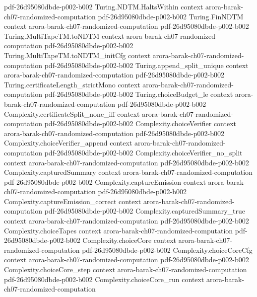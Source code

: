 \begin{theorem}
  {pdf-26d95080dbde-p002-b002}
\proofstep
  {Turing.NDTM.HaltsWithin}
  {context}
  {arora-barak-ch07-randomized-computation}
  {pdf-26d95080dbde-p002-b002}
\proofstep
  {Turing.FinNDTM}
  {context}
  {arora-barak-ch07-randomized-computation}
  {pdf-26d95080dbde-p002-b002}
\proofstep
  {Turing.MultiTapeTM.toNDTM}
  {context}
  {arora-barak-ch07-randomized-computation}
  {pdf-26d95080dbde-p002-b002}
\proofstep
  {Turing.MultiTapeTM.toNDTM_initCfg}
  {context}
  {arora-barak-ch07-randomized-computation}
  {pdf-26d95080dbde-p002-b002}
\proofstep
  {Turing.append_split_unique}
  {context}
  {arora-barak-ch07-randomized-computation}
  {pdf-26d95080dbde-p002-b002}
\proofstep
  {Turing.certificateLength_strictMono}
  {context}
  {arora-barak-ch07-randomized-computation}
  {pdf-26d95080dbde-p002-b002}
\proofstep
  {Turing.choiceBudget_le}
  {context}
  {arora-barak-ch07-randomized-computation}
  {pdf-26d95080dbde-p002-b002}
\proofstep
  {Complexity.certificateSplit_none_iff}
  {context}
  {arora-barak-ch07-randomized-computation}
  {pdf-26d95080dbde-p002-b002}
\proofstep
  {Complexity.choiceVerifier}
  {context}
  {arora-barak-ch07-randomized-computation}
  {pdf-26d95080dbde-p002-b002}
\proofstep
  {Complexity.choiceVerifier_append}
  {context}
  {arora-barak-ch07-randomized-computation}
  {pdf-26d95080dbde-p002-b002}
\proofstep
  {Complexity.choiceVerifier_no_split}
  {context}
  {arora-barak-ch07-randomized-computation}
  {pdf-26d95080dbde-p002-b002}
\proofstep
  {Complexity.capturedSummary}
  {context}
  {arora-barak-ch07-randomized-computation}
  {pdf-26d95080dbde-p002-b002}
\proofstep
  {Complexity.captureEmission}
  {context}
  {arora-barak-ch07-randomized-computation}
  {pdf-26d95080dbde-p002-b002}
\proofstep
  {Complexity.captureEmission_correct}
  {context}
  {arora-barak-ch07-randomized-computation}
  {pdf-26d95080dbde-p002-b002}
\proofstep
  {Complexity.capturedSummary_true}
  {context}
  {arora-barak-ch07-randomized-computation}
  {pdf-26d95080dbde-p002-b002}
\proofstep
  {Complexity.choiceTapes}
  {context}
  {arora-barak-ch07-randomized-computation}
  {pdf-26d95080dbde-p002-b002}
\proofstep
  {Complexity.choiceCore}
  {context}
  {arora-barak-ch07-randomized-computation}
  {pdf-26d95080dbde-p002-b002}
\proofstep
  {Complexity.choiceCoreCfg}
  {context}
  {arora-barak-ch07-randomized-computation}
  {pdf-26d95080dbde-p002-b002}
\proofstep
  {Complexity.choiceCore_step}
  {context}
  {arora-barak-ch07-randomized-computation}
  {pdf-26d95080dbde-p002-b002}
\proofstep
  {Complexity.choiceCore_run}
  {context}
  {arora-barak-ch07-randomized-computation}

\end{theorem}
